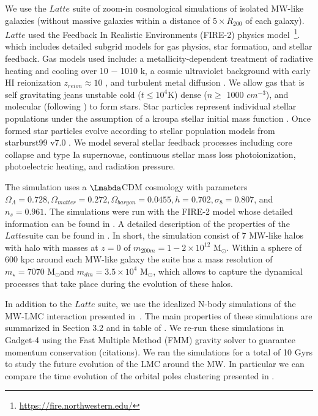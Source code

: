 \documentclass{aastex63}
\newcommand{\Msun}{M$_{\odot}$}
\newcommand{\latte}{$Latte$}
\begin{document}
We use the $Latte$ suite of zoom-in cosmological simulations of isolated MW-like galaxies (without massive galaxies within a distance of $5\times R_{200}$ of each galaxy). $Latte$ used the Feedback In Realistic Environments (FIRE-2) physics model~\footnote{\hyperref[https://fire.northwestern.edu/]{https://fire.northwestern.edu/}}. which includes detailed subgrid models
for gas physics, star formation, and stellar feedback. Gas models
used include: a metallicity-dependent treatment of radiative heating and cooling over 10 − 1010 k, a cosmic ultraviolet background with early HI reionization $z_{reion} \approx 10$ \citep{faucher-}, and turbulent metal diffusion \citep{hopkins16, su17, escala18}. We allow gas that is self gravitating jeans unstable cold ($t \leq 10^4$K)  dense ($n \geq $ 1000 $cm^{-3}$), and molecular (following \citep{krumholds}) to form stars. Star particles represent individual stellar populations under the assumption of a kroupa stellar initial mass function \citep{Kroupa01}. Once formed star particles evolve according to stellar population models from starburst99 v7.0 \cite{leitherer}. We model several stellar feedback processes including core collapse and type Ia supernovae, continuous stellar mass loss  photoionization, photoelectric heating, and radiation pressure. 


The simulation uses a $\Lmabda$CDM cosmology with parameters $\Omega_{\Lambda} = 0.728, \Omega_{matter} = 0.272, \Omega_{baryon} = 0.0455, h = 0.702, \sigma_8 = 0.807$, and $n_s = 0.961$. The simulations were run with the FIRE-2 model whose detailed information can be found in \citep{hopkins2018fire}. A detailed
description of the properties of the \latte suite can be found in \citep{Wetzel16}. In short, the simulation consist of 7 MW-like halos with halo 
with masses at $z=0$ of  $m_{200m} = 1 − 2 \times 10^{12}$ \Msun. Within a 
sphere of 600 kpc around each MW-like galaxy the suite has a mass resolution of 
$m_{\star} = 7070$ \Msun and $m_{dm} = 3.5 \times 10^4$ \Msun,  which allows to 
capture the dynamical processes that take place during the evolution of these 
halos.

In addition to the $Latte$ suite, we use the idealized N-body simulations of the MW-LMC interaction presented in~\citep{garavito-camargo19a, garavito-camargo21a}. The main properties of these simulations are summarized in Section 3.2 and in table of \citep{garavito-camargo21a}. We re-run these simulations in Gadget-4 \citep{Gadget4} using the Fast Multiple Method (FMM) gravity solver to guarantee momentum conservation (citations). We ran the simulations for a total of 10 Gyrs to study the future evolution of the LMC around the MW. In particular we can compare the time evolution of the orbital poles clustering presented in \citep{garavito-camargo21b}. 
\end{document}
